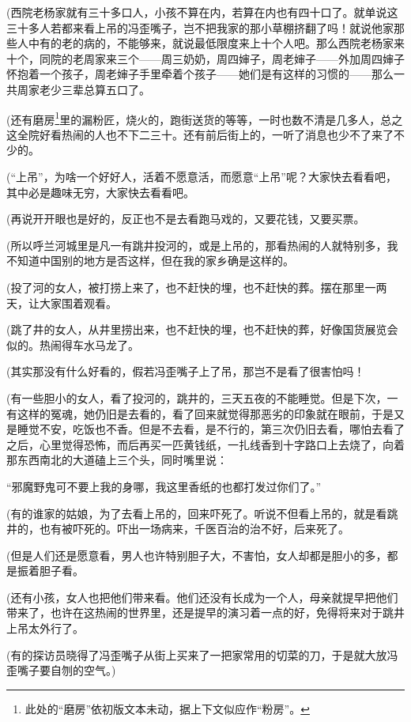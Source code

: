 \par (西院老杨家就有三十多口人，小孩不算在内，若算在内也有四十口了。就单说这三十多人若都来看上吊的冯歪嘴子，岂不把我家的那小草棚挤翻了吗！就说他家那些人中有的老的病的，不能够来，就说最低限度来上十个人吧。那么西院老杨家来十个，同院的老周家来三个——周三奶奶，周四婶子，周老婶子——外加周四婶子怀抱着一个孩子，周老婶子手里牵着个孩子——她们是有这样的习惯的——那么一共周家老少三辈总算五口了。
\par (还有磨房\footnote{此处的“磨房”依初版文本未动，据上下文似应作“粉房”。}里的漏粉匠，烧火的，跑街送货的等等，一时也数不清是几多人，总之这全院好看热闹的人也不下二三十。还有前后街上的，一听了消息也少不了来了不少的。
\par (“上吊”，为啥一个好好人，活着不愿意活，而愿意“上吊”呢？大家快去看看吧，其中必是趣味无穷，大家快去看看吧。
\par (再说开开眼也是好的，反正也不是去看跑马戏的，又要花钱，又要买票。
\par (所以呼兰河城里是凡一有跳井投河的，或是上吊的，那看热闹的人就特别多，我不知道中国别的地方是否这样，但在我的家乡确是这样的。
\par (投了河的女人，被打捞上来了，也不赶快的埋，也不赶快的葬。摆在那里一两天，让大家围着观看。
\par (跳了井的女人，从井里捞出来，也不赶快的埋，也不赶快的葬，好像国货展览会似的。热闹得车水马龙了。
\par (其实那没有什么好看的，假若冯歪嘴子上了吊，那岂不是看了很害怕吗！
\par (有一些胆小的女人，看了投河的，跳井的，三天五夜的不能睡觉。但是下次，一有这样的冤魂，她仍旧是去看的，看了回来就觉得那恶劣的印象就在眼前，于是又是睡觉不安，吃饭也不香。但是不去看，是不行的，第三次仍旧去看，哪怕去看了之后，心里觉得恐怖，而后再买一匹黄钱纸，一扎线香到十字路口上去烧了，向着那东西南北的大道磕上三个头，同时嘴里说：
\par “邪魔野鬼可不要上我的身哪，我这里香纸的也都打发过你们了。”
\par (有的谁家的姑娘，为了去看上吊的，回来吓死了。听说不但看上吊的，就是看跳井的，也有被吓死的。吓出一场病来，千医百治的治不好，后来死了。
\par (但是人们还是愿意看，男人也许特别胆子大，不害怕，女人却都是胆小的多，都是振着胆子看。
\par (还有小孩，女人也把他们带来看。他们还没有长成为一个人，母亲就提早把他们带来了，也许在这热闹的世界里，还是提早的演习着一点的好，免得将来对于跳井上吊太外行了。
\par (有的探访员晓得了冯歪嘴子从街上买来了一把家常用的切菜的刀，于是就大放冯歪嘴子要自刎的空气。)
